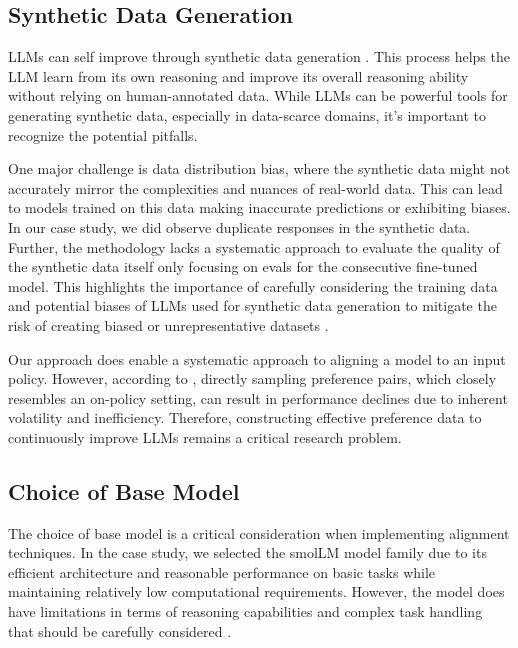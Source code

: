 \subsection{Synthetic Data Generation}

LLMs can self improve through synthetic data generation . This process helps the LLM learn from its own reasoning and improve its overall reasoning ability without relying on human-annotated data. While LLMs can be powerful tools for generating synthetic data, especially in data-scarce domains, it's important to recognize the potential pitfalls. 

One major challenge is data distribution bias, where the synthetic data might not accurately mirror the complexities and nuances of real-world data. This can lead to models trained on this data making inaccurate predictions or exhibiting biases. In our case study, we did observe duplicate responses in the synthetic data. Further, the methodology lacks a systematic approach to evaluate the quality of the synthetic data itself only focusing on evals for the consecutive fine-tuned model. This highlights the importance of carefully considering the training data and potential biases of LLMs used for synthetic data generation to mitigate the risk of creating biased or unrepresentative datasets .

Our approach does enable a systematic approach to aligning a model to an input policy. However, according to , directly sampling preference pairs, which closely resembles an on-policy setting, can result in performance declines due to inherent volatility and inefficiency. Therefore, constructing effective preference data to continuously improve LLMs remains a critical research problem.

\subsection{Choice of Base Model}

The choice of base model is a critical consideration when implementing alignment techniques. In the case study, we selected the smolLM model family due to its efficient architecture and reasonable performance on basic tasks while maintaining relatively low computational requirements. However, the model does have limitations in terms of reasoning capabilities and complex task handling that should be carefully considered .

